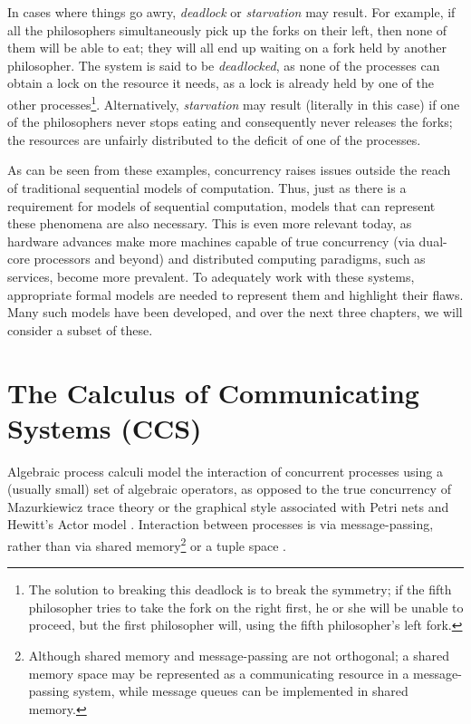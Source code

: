 In cases where things go awry, \emph{deadlock} or \emph{starvation}
may result.  For example, if all the philosophers simultaneously pick
up the forks on their left, then none of them will be able to eat;
they will all end up waiting on a fork held by another philosopher.
The system is said to be \emph{deadlocked}, as none of the processes
can obtain a lock on the resource it needs, as a lock is already held
by one of the other processes\footnote{The solution to breaking this
  deadlock is to break the symmetry; if the fifth philosopher tries to
  take the fork on the right first, he or she will be unable to
  proceed, but the first philosopher will, using the fifth
  philosopher's left fork.}.  Alternatively, \emph{starvation} may
result (literally in this case) if one of the philosophers never stops
eating and consequently never releases the forks; the resources are
unfairly distributed to the deficit of one of the processes.

As can be seen from these examples, concurrency raises issues outside
the reach of traditional sequential models of computation.  Thus, just
as there is a requirement for models of sequential computation, models
that can represent these phenomena are also necessary.  This is even
more relevant today, as hardware advances make more machines capable
of true concurrency (via dual-core processors and beyond) and
distributed computing paradigms, such as services, become more
prevalent.  To adequately work with these systems, appropriate formal
models are needed to represent them and highlight their flaws.  Many
such models have been developed, and over the next three chapters, we
will consider a subset of these.

\section{The Calculus of Communicating Systems (CCS)}
\label{ccs}

Algebraic process calculi model the interaction of concurrent
processes using a (usually small) set of algebraic operators, as
opposed to the true concurrency of Mazurkiewicz trace theory
\cite{maz:trace} or the graphical style associated with Petri nets
\cite{petri:phd} and Hewitt's Actor model \cite{hewitt:actor}.
Interaction between processes is via message-passing, rather than via
shared memory\footnote{Although shared memory and message-passing are
  not orthogonal; a shared memory space may be represented as a
  communicating resource in a message-passing system, while message
  queues can be implemented in shared memory.} or a tuple space
\cite{linda}.

